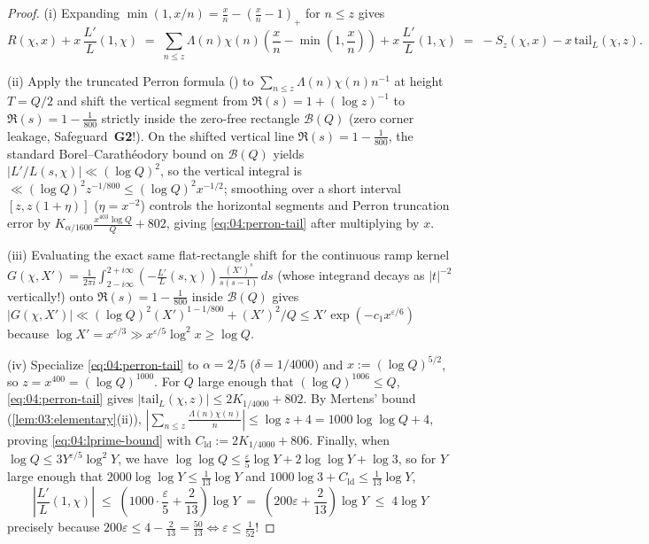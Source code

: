 \begin{proof}
(i) Expanding $\min(1, x/n) = \frac{x}{n} - (\frac{x}{n} - 1)_+$ for $n \le z$ gives
\[
  R(\chi, x) + x\,\frac{L'}{L}(1,\chi)
  \;=\; \sum_{n \le z} \Lambda(n)\chi(n)\!\left(\frac{x}{n} - \min\!\left(1, \frac{x}{n}\right)\right) + x\,\frac{L'}{L}(1, \chi)
  \;=\; -S_z(\chi, x) - x\,\mathrm{tail}_L(\chi, z).
\]

(ii) Apply the truncated Perron formula () to $\sum_{n \le z}\Lambda(n)\chi(n) n^{-1}$ at height $T = Q/2$ and shift the vertical segment from $\Re(s) = 1 + (\log z)^{-1}$ to $\Re(s) = 1 - \frac{1}{800}$ strictly inside the zero-free rectangle $\mathcal{B}(Q)$ (zero corner leakage, Safeguard~\textbf{G2}!). On the shifted vertical line $\Re(s) = 1 - \frac{1}{800}$, the standard Borel--Carath\'eodory bound on $\mathcal{B}(Q)$ yields $|L'/L(s, \chi)| \ll (\log Q)^2$, so the vertical integral is $\ll (\log Q)^2 z^{-1/800} \le (\log Q)^2 x^{-1/2}$; smoothing over a short interval $[z, z(1+\eta)]$ ($\eta = x^{-2}$) controls the horizontal segments and Perron truncation error by $K_{\alpha/1600}\frac{x^{403}\log Q}{Q} + 802$, giving \eqref{eq:04:perron-tail} after multiplying by $x$.

(iii) Evaluating the exact same flat-rectangle shift for the continuous ramp kernel $G(\chi, X') = \frac{1}{2\pi i}\int_{2-i\infty}^{2+i\infty} (-\frac{L'}{L}(s, \chi)) \frac{(X')^s}{s(s-1)}\,ds$ (whose integrand decays as $|t|^{-2}$ vertically!) onto $\Re(s) = 1 - \frac{1}{800}$ inside $\mathcal{B}(Q)$ gives $|G(\chi, X')| \ll (\log Q)^2 (X')^{1 - 1/800} + (X')^2 / Q \le X' \exp(-c_1 x^{\varepsilon/6})$ because $\log X' = x^{\varepsilon/3} \gg x^{\varepsilon/5}\log^2 x \ge \log Q$.

(iv) Specialize \eqref{eq:04:perron-tail} to $\alpha = 2/5$ ($\delta = 1/4000$) and $x := (\log Q)^{5/2}$, so $z = x^{400} = (\log Q)^{1000}$. For $Q$ large enough that $(\log Q)^{1006} \le Q$, \eqref{eq:04:perron-tail} gives $|\mathrm{tail}_L(\chi, z)| \le 2 K_{1/4000} + 802$. By Mertens' bound (\cref{lem:03:elementary}(ii)), $|\sum_{n \le z} \frac{\Lambda(n)\chi(n)}{n}| \le \log z + 4 = 1000\log\log Q + 4$, proving \eqref{eq:04:lprime-bound} with $C_{\mathrm{ld}} := 2 K_{1/4000} + 806$. Finally, when $\log Q \le 3 Y^{\varepsilon/5}\log^2 Y$, we have $\log\log Q \le \frac{\varepsilon}{5}\log Y + 2\log\log Y + \log 3$, so for $Y$ large enough that $2000\log\log Y \le \frac{1}{13}\log Y$ and $1000\log 3 + C_{\mathrm{ld}} \le \frac{1}{13}\log Y$,
\[
  \left|\frac{L'}{L}(1, \chi)\right|
  \;\le\; \left(1000 \cdot \frac{\varepsilon}{5} + \frac{2}{13}\right)\log Y
  \;=\; \left(200\varepsilon + \frac{2}{13}\right)\log Y \;\le\; 4\log Y
\]
precisely because $200\varepsilon \le 4 - \frac{2}{13} = \frac{50}{13} \iff \varepsilon \le \frac{1}{52}$!
\end{proof}

